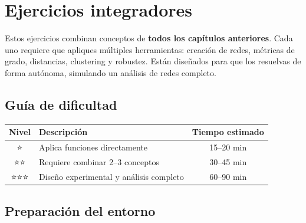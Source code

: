 \documentclass[
  letterpaper,
  DIV=11,
  numbers=noendperiod]{scrreprt}
\begin{document}

\chapter{Ejercicios integradores}\label{sec-ejercicios-integradores}

\begin{tcolorbox}[enhanced jigsaw, toprule=.15mm, colframe=quarto-callout-note-color-frame, coltitle=black, titlerule=0mm, colback=white, breakable, leftrule=.75mm, arc=.35mm, bottomtitle=1mm, toptitle=1mm, rightrule=.15mm, bottomrule=.15mm, left=2mm, title=\textcolor{quarto-callout-note-color}{\faInfo}\hspace{0.5em}{🎯 Propósito de este capítulo}, colbacktitle=quarto-callout-note-color!10!white, opacityback=0, opacitybacktitle=0.6]

Estos ejercicios combinan conceptos de \textbf{todos los capítulos
anteriores}. Cada uno requiere que apliques múltiples herramientas:
creación de redes, métricas de grado, distancias, clustering y robustez.
Están diseñados para que los resuelvas de forma autónoma, simulando un
análisis de redes completo.

\end{tcolorbox}

\section*{Guía de dificultad}\label{guuxeda-de-dificultad}


\begin{longtable}[]{@{}clc@{}}
\toprule\noalign{}
Nivel & Descripción & Tiempo estimado \\
\midrule\noalign{}
\endhead
\bottomrule\noalign{}
\endlastfoot
⭐ & Aplica funciones directamente & 15--20 min \\
⭐⭐ & Requiere combinar 2--3 conceptos & 30--45 min \\
⭐⭐⭐ & Diseño experimental y análisis completo & 60--90 min \\
\end{longtable}

\section{Preparación del entorno}\label{preparaciuxf3n-del-entorno-7}
\end{document}
